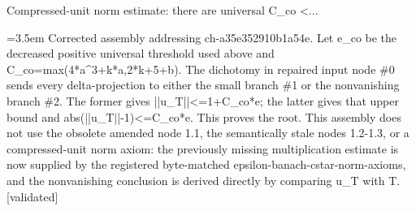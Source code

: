 \documentclass{article}
\newcommand{\step}[1]{\par\noindent\hangindent=3.5em\hangafter=1%
  \makebox[3.5em][l]{\textbf{#1.}}}
\newcommand{\steptag}[1]{\hfill{\small\textsf{[#1]}}}
\begin{document}
\begin{proofbox}{Compressed-unit norm estimate: there are universal C\_co <...}
\step{1.8} Corrected assembly addressing ch-a35e352910b1a54e. Let e\_co be the decreased positive universal threshold used above and C\_co=max(4*a\textasciicircum{}3+k*a,2*k+5+b). The dichotomy in repaired input node \#0 sends every delta-projection to either the small branch \#1 or the nonvanishing branch \#2. The former gives ||u\_T||<=1+C\_co*e; the latter gives that upper bound and abs(||u\_T||-1)<=C\_co*e. This proves the root. This assembly does not use the obsolete amended node 1.1, the semantically stale nodes 1.2-1.3, or a compressed-unit norm axiom: the previously missing multiplication estimate is now supplied by the registered byte-matched epsilon-banach-cstar-norm-axioms, and the nonvanishing conclusion is derived directly by comparing u\_T with T. \steptag{validated} \\[4pt]
\end{proofbox}
\end{document}
